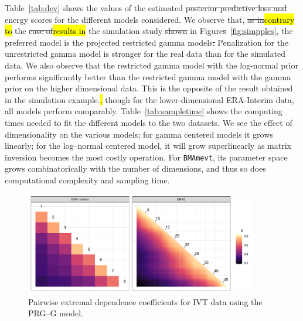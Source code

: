 \documentclass[iicol,sn-basic]{sn-jnl}
\theoremstyle{thmstyleone}
\begin{document}
Table~\ref{tab:dev} shows the values of the estimated \st{posterior predictive loss and }energy scores for the different models considered. We observe that, \st{as in}\hl{contrary to} the \st{case of}\hl{results in} the simulation study \st{shown} in Figure\st{s}~\ref{fig:simpples}, the preferred model is the projected restricted gamma models{\st .  Penalization for the unrestricted gamma model is stronger for the real data than for the simulated data. We also observe that the restricted gamma model with the log-normal prior performs significantly better than the restricted gamma model with the gamma prior on the higher dimensional data. This is the opposite of the result obtained in the simulation example.}{\hl, though for the lower-dimensional ERA-Interim data, all models perform comparably.  Table~\ref{tab:sampletime} shows the computing times needed to fit the different models to the two datasets.  We see the effect of dimensionality on the various models; for gamma centered models it grows linearly; for the log--normal centered model, it will grow superlinearly as matrix inversion becomes the most costly operation.  For \texttt{BMAmevt}, its parameter space grows combinatorically with the number of dimensions, and thus so does computational complexity and sampling time.}

\begin{figure}[htb]
\centering
\caption{Pairwise extremal dependence coefficients for IVT data using the PRG--G model.\label{fig:chi_ij}}
\includegraphics[width=0.9\textwidth]{./images/chi_ij_c}
\end{figure}
\end{document}
